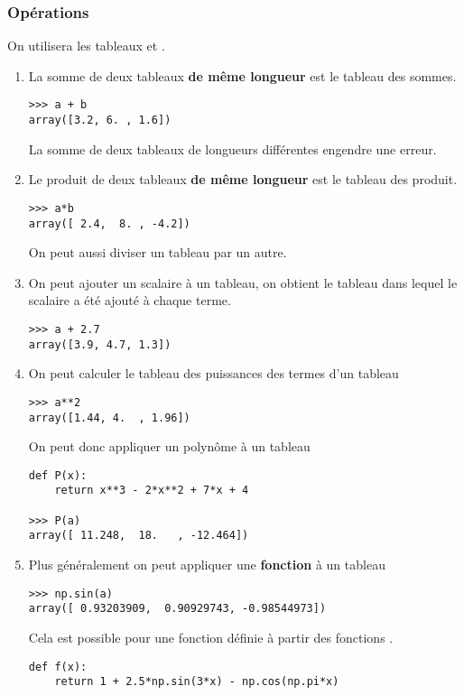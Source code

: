 \subsubsection{Opérations}
On utilisera les tableaux  et .
\begin{enumerate}
\item La somme de deux tableaux {\bf de même longueur} est le tableau des sommes.
\begin{lstlisting}
>>> a + b
array([3.2, 6. , 1.6])
\end{lstlisting}
La somme de deux tableaux de longueurs différentes engendre une erreur.
\item Le produit de deux tableaux {\bf de même longueur} est le tableau des produit.
\begin{lstlisting}
>>> a*b
array([ 2.4,  8. , -4.2])
\end{lstlisting}
On peut aussi diviser un tableau par un autre.
\item On peut ajouter un scalaire à un tableau, on obtient le tableau dans lequel le scalaire a été ajouté à chaque terme.
\begin{lstlisting}
>>> a + 2.7
array([3.9, 4.7, 1.3])
\end{lstlisting}
\item On peut calculer le tableau des puissances des termes d'un tableau
\begin{lstlisting}
>>> a**2
array([1.44, 4.  , 1.96])
\end{lstlisting}
On peut donc appliquer un polynôme à un tableau
\begin{lstlisting}
def P(x):
    return x**3 - 2*x**2 + 7*x + 4

>>> P(a)
array([ 11.248,  18.   , -12.464])
\end{lstlisting}
\item Plus généralement on peut appliquer une {\bf fonction } à un tableau
\begin{lstlisting}
>>> np.sin(a)
array([ 0.93203909,  0.90929743, -0.98544973])
\end{lstlisting}
Cela est possible pour une fonction définie à partir des fonctions .
\begin{lstlisting}
def f(x):
    return 1 + 2.5*np.sin(3*x) - np.cos(np.pi*x)


\end{lstlisting}
\end{enumerate}
